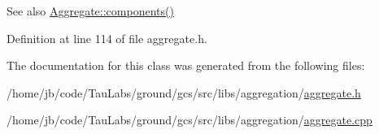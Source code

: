 \begin{DoxySeeAlso}{\-See also}
\hyperlink{class_aggregation_1_1_aggregate_ad2189eec2b5f725c0a0db81d5fbf3e25}{\-Aggregate\-::components()} 
\end{DoxySeeAlso}


\-Definition at line 114 of file aggregate.\-h.



\-The documentation for this class was generated from the following files\-:\begin{DoxyCompactItemize}
\item 
/home/jb/code/\-Tau\-Labs/ground/gcs/src/libs/aggregation/\hyperlink{aggregate_8h}{aggregate.\-h}\item 
/home/jb/code/\-Tau\-Labs/ground/gcs/src/libs/aggregation/\hyperlink{aggregate_8cpp}{aggregate.\-cpp}\end{DoxyCompactItemize}
